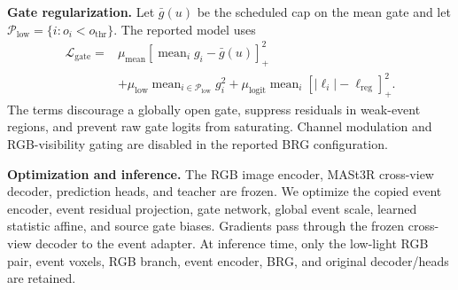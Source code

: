 \vspace{+5pt}
\noindent\textbf{Gate regularization.}
Let $\bar g(u)$ be the scheduled cap on the mean gate and let
$\mathcal{P}_{\mathrm{low}}=\{i:o_i<o_{\mathrm{thr}}\}$.  The reported model
uses
\begin{equation}
\begin{aligned}
\mathcal{L}_{\mathrm{gate}}
={}&\mu_{\mathrm{mean}}
\left[\operatorname{mean}_i g_i-\bar g(u)\right]_{+}^{2}\\
&+\mu_{\mathrm{low}}
\operatorname{mean}_{i\in\mathcal{P}_{\mathrm{low}}}g_i^2
+\mu_{\mathrm{logit}}
\operatorname{mean}_i
\left[|\ell_i|-\ell_{\mathrm{reg}}\right]_{+}^{2}.
\end{aligned}
\label{eq:gate_regularization}
\end{equation}
The terms discourage a globally open gate, suppress residuals in weak-event
regions, and prevent raw gate logits from saturating.  Channel modulation and
RGB-visibility gating are disabled in the reported BRG configuration.

\vspace{+5pt}
\noindent\textbf{Optimization and inference.}
The RGB image encoder, MASt3R cross-view decoder, prediction heads, and teacher
are frozen.  We optimize the copied event encoder, event residual projection,
gate network, global event scale, learned statistic affine, and source gate
biases.  Gradients pass through the frozen cross-view decoder to the event
adapter.  At inference time, only the low-light RGB pair, event voxels, RGB
branch, event encoder, BRG, and original decoder/heads are retained.
